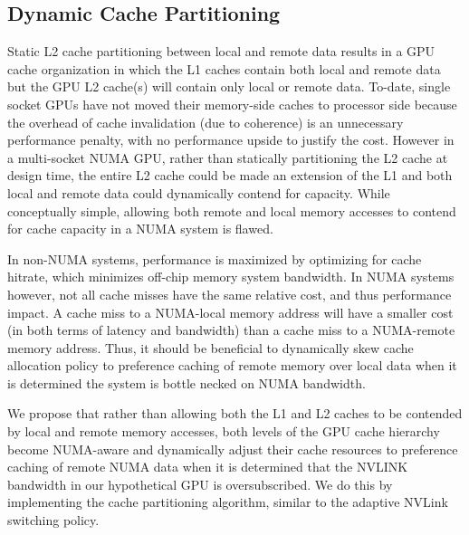 \subsection{Dynamic Cache Partitioning}

Static L2 cache partitioning between local and remote data results in a GPU cache
organization in which the L1 caches contain both local and remote data but the GPU
L2 cache(s) will contain only local or remote data.  To-date, single socket GPUs
have not moved their memory-side caches to processor side because the overhead of
cache invalidation (due to coherence) is an unnecessary performance penalty, with
no performance upside to justify the cost.  However in a multi-socket NUMA GPU,
rather than statically partitioning the L2 cache at design time, the entire L2 cache
could be made an extension of the L1 and both local and remote data could dynamically
contend for capacity.  While conceptually simple, allowing both remote and local
memory accesses to contend for cache capacity in a NUMA system is flawed.

In non-NUMA systems, performance is maximized by optimizing for cache hitrate, which
minimizes off-chip memory system bandwidth.  In NUMA systems however, not all cache
misses have the same relative cost, and thus performance impact.  A cache miss to a 
NUMA-local memory address will have a smaller cost (in both terms of latency and bandwidth)
than a cache miss to a NUMA-remote memory address.  Thus, it should be beneficial
to dynamically skew cache allocation policy to preference caching of remote memory over local
data when it is determined the system is bottle necked on NUMA bandwidth.

We propose that rather than allowing both the L1 and L2 caches to be contended by local
and remote memory accesses,  both levels of the GPU cache hierarchy become NUMA-aware
and dynamically adjust their cache resources to preference caching of remote NUMA
data when it is determined that the NVLINK bandwidth in our hypothetical GPU is
oversubscribed.  We do this by implementing the cache partitioning
algorithm, similar to the adaptive NVLink switching policy.

